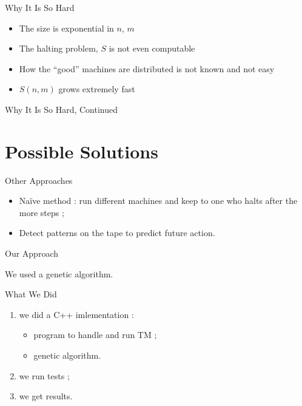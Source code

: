 \documentclass{beamer}
\begin{document}
\begin{frame}{Why It Is So Hard}

\begin{itemize}
\item The size is exponential in $n$, $m$
\item The halting problem, $S$ is not even computable
\item How the ``good'' machines are distributed is not known and not easy
\item $S(n,m)$ grows extremely fast
\end{itemize}
\end{frame}

\begin{frame}{Why It Is So Hard, Continued}

\end{frame}

\section{Possible Solutions}

\begin{frame}{Other Approaches}

\begin{itemize}
\item Naïve method : run different machines and keep to one who halts after the more steps ; %
\item Detect patterns on the tape to predict future action.
\end{itemize}

\end{frame}

\begin{frame}{Our Approach}

We used a genetic algorithm.
\end{frame}

\begin{frame}{What We Did}

\begin{enumerate}
\item we did a C++ imlementation :
  \begin{itemize}
  \item program to handle and run TM ;
  \item genetic algorithm.
  \end{itemize}
\item we run tests ;
\item we get results.
\end{enumerate}
\end{frame}
\end{document}
